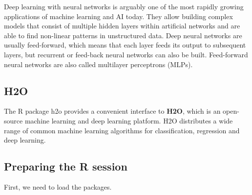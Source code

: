 \documentclass[]{book}
\begin{document}
Deep learning with neural networks is arguably one of the most rapidly growing applications of machine learning and AI today. They allow building complex models that consist of multiple hidden layers within artificial networks and are able to find non-linear patterns in unstructured data. Deep neural networks are usually feed-forward, which means that each layer feeds its output to subsequent layers, but recurrent or feed-back neural networks can also be built. Feed-forward neural networks are also called multilayer perceptrons (MLPs).

\hypertarget{h2o}{%
\subsection{H2O}\label{h2o}}

The R package h2o provides a convenient interface to \textbf{H2O}, which is an open-source machine learning and deep learning platform. H2O distributes a wide range of common machine learning algorithms for classification, regression and deep learning.

\hypertarget{preparing-the-r-session}{%
\subsection{Preparing the R session}\label{preparing-the-r-session}}

First, we need to load the packages.
\end{document}
